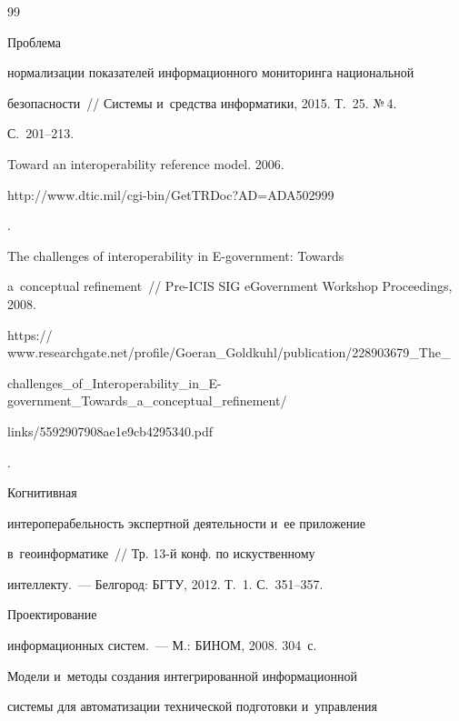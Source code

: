 {{\begin{thebibliography}{99}


 Проб\-ле\-ма 


нормализации показателей информационного мониторинга национальной  


без\-опас\-ности~/\!\!/ Системы и~средства информатики, 2015. Т.~25. №\,4.  


С.~201--213.




 Toward an interoperability reference model. 2006. {\sf 


http://www.\linebreak dtic.mil/cgi-bin/GetTRDoc?AD=ADA502999}.




 The challenges of interoperability in E-government: Towards 


a~conceptual refinement~/\!\!/ Pre-ICIS SIG eGovernment Workshop Proceedings,  2008. 


{\sf 


https:// www.researchgate.net/profile/Goeran\_Goldkuhl/publication/228903679\_The\_\linebreak


challenges\_of\_Interoperability\_in\_E-government\_Towards\_a\_conceptual\_refinement/\linebreak 


links/5592907908ae1e9cb4295340.pdf}.




 Когнитивная 


интероперабельность экспертной деятельности и~ее приложение 


в~геоинформатике~/\!\!/ Тр. 13-й конф. по искуственному  


интеллекту.~--- Белгород: БГТУ, 2012. Т.~1. С.~351--357.




 Проектирование 


информационных сис\-тем.~--- М.: БИНОМ, 2008. 304~с.




 Модели и~методы создания интегрированной информационной 


сис\-те\-мы для автоматизации технической подготовки и~управ\-ле\-ния 



\end{thebibliography}}}
